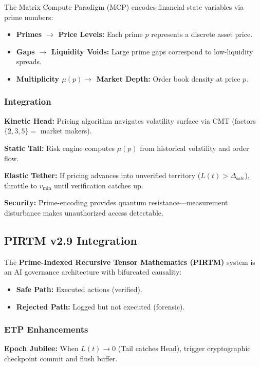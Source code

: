 \documentclass[12pt,a4paper]{article}
\begin{document}
The Matrix Compute Paradigm (MCP) encodes financial state variables via prime numbers:
\begin{itemize}
\item \textbf{Primes $\to$ Price Levels:} Each prime $p$ represents a discrete asset price.
\item \textbf{Gaps $\to$ Liquidity Voids:} Large prime gaps correspond to low-liquidity spreads.
\item \textbf{Multiplicity $\mu(p) \to$ Market Depth:} Order book density at price $p$.
\end{itemize}

\subsubsection{Integration}

\textbf{Kinetic Head:} Pricing algorithm navigates volatility surface via CMT (factors $\{2,3,5\} =$ market makers).

\textbf{Static Tail:} Risk engine computes $\mu(p)$ from historical volatility and order flow.

\textbf{Elastic Tether:} If pricing advances into unverified territory ($L(t) > \Delta_{\text{safe}}$), throttle to $v_{\min}$ until verification catches up.

\textbf{Security:} Prime-encoding provides quantum resistance—measurement disturbance makes unauthorized access detectable.

\subsection{PIRTM v2.9 Integration}

The \textbf{Prime-Indexed Recursive Tensor Mathematics (PIRTM)} system is an AI governance architecture with bifurcated causality:
\begin{itemize}
\item \textbf{Safe Path:} Executed actions (verified).
\item \textbf{Rejected Path:} Logged but not executed (forensic).
\end{itemize}

\subsubsection{ETP Enhancements}

\textbf{Epoch Jubilee:} When $L(t) \to 0$ (Tail catches Head), trigger cryptographic checkpoint commit and flush buffer.
\end{document}
